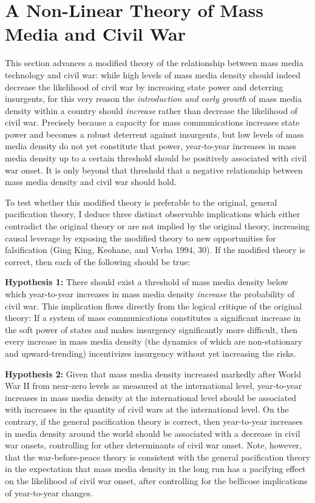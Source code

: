\documentclass[11pt,article,oneside]{memoir}
\begin{document}
\section{A Non-Linear Theory of Mass Media and Civil
War}\label{a-non-linear-theory-of-mass-media-and-civil-war}

This section advances a modified theory of the relationship between mass
media technology and civil war: while high levels of mass media density
should indeed decrease the likelihood of civil war by increasing state
power and deterring insurgents, for this very reason the
\emph{introduction and early growth} of mass media density within a
country should \emph{increase} rather than decrease the likelihood of
civil war. Precisely because a capacity for mass communications
increases state power and becomes a robust deterrent against insurgents,
but low levels of mass media density do not yet constitute that power,
year-to-year increases in mass media density up to a certain threshold
should be positively associated with civil war onset. It is only beyond
that threshold that a negative relationship between mass media density
and civil war should hold.

To test whether this modified theory is preferable to the original,
general pacification theory, I deduce three distinct observable
implications which either contradict the original theory or are not
implied by the original theory, increasing causal leverage by exposing
the modified theory to new opportunities for falsification (Ging King,
Keohane, and Verba 1994, 30). If the modified theory is correct, then
each of the following should be true:

\textbf{Hypothesis 1:} There should exist a threshold of mass media
density below which year-to-year increases in mass media density
\emph{increase} the probability of civil war. This implication flows
directly from the logical critique of the original theory: If a system
of mass communications constitutes a significant increase in the soft
power of states and makes insurgency significantly more difficult, then
every increase in mass media density (the dynamics of which are
non-stationary and upward-trending) incentivizes insurgency without yet
increasing the risks.

\textbf{Hypothesis 2:} Given that mass media density increased markedly
after World War II from near-zero levels as measured at the
international level, year-to-year increases in mass media density at the
international level should be associated with increases in the quantity
of civil wars at the international level. On the contrary, if the
general pacification theory is correct, then year-to-year increases in
media density around the world should be associated with a decrease in
civil war onsets, controlling for other determinants of civil war onset.
Note, however, that the war-before-peace theory is consistent with the
general pacification theory in the expectation that mass media density
in the long run has a pacifying effect on the likelihood of civil war
onset, after controlling for the bellicose implications of year-to-year
changes.
\end{document}
